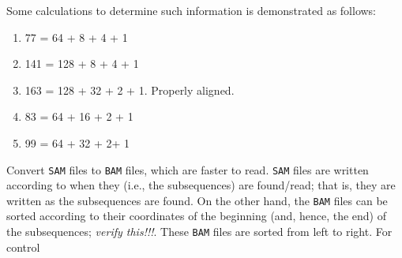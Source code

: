 Some calculations to determine such information is demonstrated as follows: \vspace{-0.3cm}
\begin{enumerate} \itemsep -4pt
\item 77 = 64 + 8 + 4 + 1
\item 141 = 128 + 8 + 4 + 1
\item 163 = 128 + 32 + 2 + 1. Properly aligned.
\item 83 = 64 + 16 + 2 + 1
\item 99 = 64 + 32 + 2+ 1
\end{enumerate}

Convert {\tt SAM} files to {\tt BAM} files, which are faster to read. {\tt SAM} files are written according to when they (i.e., the subsequences) are found/read; that is, they are written as the subsequences are found. On the other hand, the {\tt BAM} files can be sorted according to their coordinates of the beginning (and, hence, the end) of the subsequences; {\it verify this!!!}. These {\tt BAM} files are sorted from left to right. For control
















